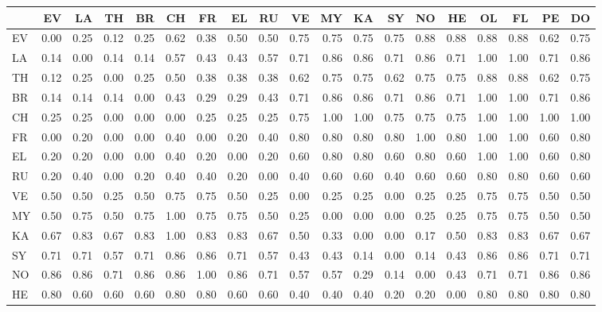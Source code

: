 
\begin{tabular}[t]{l|r|r|r|r|r|r|r|r|r|r|r|r|r|r|r|r|r|r}
\hline
  & EV & LA & TH & BR & CH & FR & EL & RU & VE & MY & KA & SY & NO & HE & OL & FL & PE & DO\\
\hline
EV & 0.00 & 0.25 & 0.12 & 0.25 & 0.62 & 0.38 & 0.50 & 0.50 & 0.75 & 0.75 & 0.75 & 0.75 & 0.88 & 0.88 & 0.88 & 0.88 & 0.62 & 0.75\\
\hline
LA & 0.14 & 0.00 & 0.14 & 0.14 & 0.57 & 0.43 & 0.43 & 0.57 & 0.71 & 0.86 & 0.86 & 0.71 & 0.86 & 0.71 & 1.00 & 1.00 & 0.71 & 0.86\\
\hline
TH & 0.12 & 0.25 & 0.00 & 0.25 & 0.50 & 0.38 & 0.38 & 0.38 & 0.62 & 0.75 & 0.75 & 0.62 & 0.75 & 0.75 & 0.88 & 0.88 & 0.62 & 0.75\\
\hline
BR & 0.14 & 0.14 & 0.14 & 0.00 & 0.43 & 0.29 & 0.29 & 0.43 & 0.71 & 0.86 & 0.86 & 0.71 & 0.86 & 0.71 & 1.00 & 1.00 & 0.71 & 0.86\\
\hline
CH & 0.25 & 0.25 & 0.00 & 0.00 & 0.00 & 0.25 & 0.25 & 0.25 & 0.75 & 1.00 & 1.00 & 0.75 & 0.75 & 0.75 & 1.00 & 1.00 & 1.00 & 1.00\\
\hline
FR & 0.00 & 0.20 & 0.00 & 0.00 & 0.40 & 0.00 & 0.20 & 0.40 & 0.80 & 0.80 & 0.80 & 0.80 & 1.00 & 0.80 & 1.00 & 1.00 & 0.60 & 0.80\\
\hline
EL & 0.20 & 0.20 & 0.00 & 0.00 & 0.40 & 0.20 & 0.00 & 0.20 & 0.60 & 0.80 & 0.80 & 0.60 & 0.80 & 0.60 & 1.00 & 1.00 & 0.60 & 0.80\\
\hline
RU & 0.20 & 0.40 & 0.00 & 0.20 & 0.40 & 0.40 & 0.20 & 0.00 & 0.40 & 0.60 & 0.60 & 0.40 & 0.60 & 0.60 & 0.80 & 0.80 & 0.60 & 0.60\\
\hline
VE & 0.50 & 0.50 & 0.25 & 0.50 & 0.75 & 0.75 & 0.50 & 0.25 & 0.00 & 0.25 & 0.25 & 0.00 & 0.25 & 0.25 & 0.75 & 0.75 & 0.50 & 0.50\\
\hline
MY & 0.50 & 0.75 & 0.50 & 0.75 & 1.00 & 0.75 & 0.75 & 0.50 & 0.25 & 0.00 & 0.00 & 0.00 & 0.25 & 0.25 & 0.75 & 0.75 & 0.50 & 0.50\\
\hline
KA & 0.67 & 0.83 & 0.67 & 0.83 & 1.00 & 0.83 & 0.83 & 0.67 & 0.50 & 0.33 & 0.00 & 0.00 & 0.17 & 0.50 & 0.83 & 0.83 & 0.67 & 0.67\\
\hline
SY & 0.71 & 0.71 & 0.57 & 0.71 & 0.86 & 0.86 & 0.71 & 0.57 & 0.43 & 0.43 & 0.14 & 0.00 & 0.14 & 0.43 & 0.86 & 0.86 & 0.71 & 0.71\\
\hline
NO & 0.86 & 0.86 & 0.71 & 0.86 & 0.86 & 1.00 & 0.86 & 0.71 & 0.57 & 0.57 & 0.29 & 0.14 & 0.00 & 0.43 & 0.71 & 0.71 & 0.86 & 0.86\\
\hline
HE & 0.80 & 0.60 & 0.60 & 0.60 & 0.80 & 0.80 & 0.60 & 0.60 & 0.40 & 0.40 & 0.40 & 0.20 & 0.20 & 0.00 & 0.80 & 0.80 & 0.80 & 0.80\\

\end{tabular}
